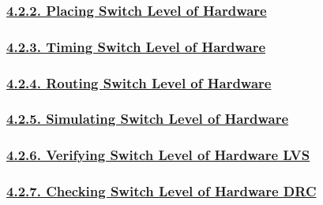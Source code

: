 \documentclass[
]{article}
\begin{document}
\hypertarget{placing-switch-level-of-hardware}{%
\subsubsection{\texorpdfstring{\protect\hyperlink{placing-switch-level-of-hardware-1}{4.2.2.
Placing Switch Level of
Hardware}}{4.2.2. Placing Switch Level of Hardware}}\label{placing-switch-level-of-hardware}}

\hypertarget{timing-switch-level-of-hardware}{%
\subsubsection{\texorpdfstring{\protect\hyperlink{timing-switch-level-of-hardware-1}{4.2.3.
Timing Switch Level of
Hardware}}{4.2.3. Timing Switch Level of Hardware}}\label{timing-switch-level-of-hardware}}

\hypertarget{routing-switch-level-of-hardware}{%
\subsubsection{\texorpdfstring{\protect\hyperlink{routing-switch-level-of-hardware-1}{4.2.4.
Routing Switch Level of
Hardware}}{4.2.4. Routing Switch Level of Hardware}}\label{routing-switch-level-of-hardware}}

\hypertarget{simulating-switch-level-of-hardware}{%
\subsubsection{\texorpdfstring{\protect\hyperlink{simulating-switch-level-of-hardware-1}{4.2.5.
Simulating Switch Level of
Hardware}}{4.2.5. Simulating Switch Level of Hardware}}\label{simulating-switch-level-of-hardware}}

\hypertarget{verifying-switch-level-of-hardware-lvs}{%
\subsubsection{\texorpdfstring{\protect\hyperlink{verifying-switch-level-of-hardware-lvs-1}{4.2.6.
Verifying Switch Level of Hardware
LVS}}{4.2.6. Verifying Switch Level of Hardware LVS}}\label{verifying-switch-level-of-hardware-lvs}}

\hypertarget{checking-switch-level-of-hardware-drc}{%
\subsubsection{\texorpdfstring{\protect\hyperlink{checking-switch-level-of-hardware-drc-1}{4.2.7.
Checking Switch Level of Hardware
DRC}}{4.2.7. Checking Switch Level of Hardware DRC}}\label{checking-switch-level-of-hardware-drc}}
\end{document}
